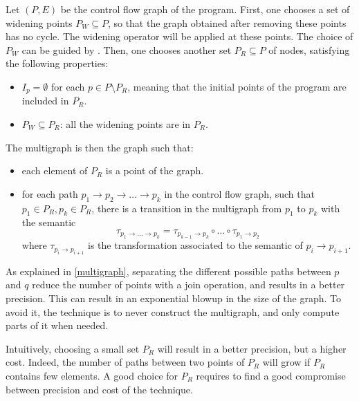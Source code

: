 \documentclass[a4paper,english,titlepage,11pt]{report}
\begin{document}
	Let $(P,E)$ be the control flow graph of the program.
	First, one chooses a set of widening points $P_W \subseteq P$, so that the graph
	obtained after removing these points has no cycle. The widening operator
	will be applied at these points. The choice of $P_W$ can be guided by
	\cite{Bou92}.
	Then, one chooses another set $P_R \subseteq P$ of nodes, satisfying the
	following properties:
	\begin{itemize}
	\item $I_p = \emptyset$ for each $p \in P \setminus P_R$, meaning that the initial
	points of the program are included in $P_R$.
	\item $P_W \subseteq P_R$: all the widening points are in $P_R$.
	\end{itemize} 

	The multigraph is then the graph such that:
	\begin{itemize}
	\item each element of $P_R$ is a point of the graph.
	\item for each path $p_1 \rightarrow p_2 \rightarrow \dots \rightarrow p_k$
	in the control flow graph, such that $p_1 \in P_R, p_k \in P_R$,
	there is a transition in the multigraph from $p_1$ to $p_k$ with the
	semantic $$\tau_{p_1 \rightarrow \dots \rightarrow p_k} = \tau_{p_{k-1}
	\rightarrow p_k} \circ
	\dots \circ \tau_{p_1 \rightarrow p_2}$$ where $\tau_{p_i \rightarrow
	p_{i+1}}$ is the transformation associated to the semantic of $p_i
	\rightarrow p_{i+1}$.
	\end{itemize}

	As explained in \ref{multigraph}, separating the different
	possible paths between $p$ and $q$ reduce the number of points with a join
	operation, and results in a better precision.
	This can result in an exponential blowup in the size of the graph. To avoid
	it, the technique is to never construct the multigraph, and only compute
	parts of it when needed.

	Intuitively, choosing a small set $P_R$ will result in a better precision,
	but a higher cost. 
	Indeed, the number of paths between two points of $P_R$ will grow if $P_R$
	contains few elements.
	A good choice for $P_R$ requires to find a good
	compromise between precision and cost of the technique.
\end{document}
